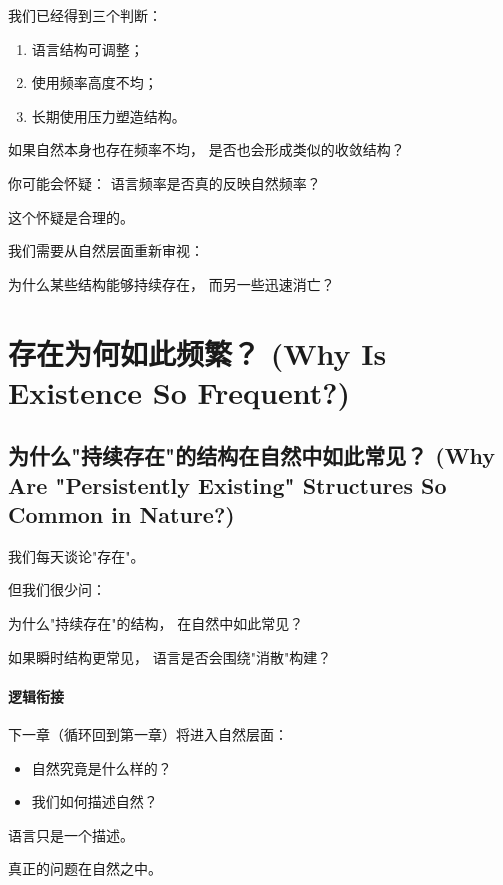 \documentclass[../main.tex]{subfiles}
\begin{document}
我们已经得到三个判断：

\begin{enumerate}
	\item 语言结构可调整；
	\item 使用频率高度不均；
	\item 长期使用压力塑造结构。
\end{enumerate}

\begin{questionbox}
	如果自然本身也存在频率不均，
	是否也会形成类似的收敛结构？
\end{questionbox}

\begin{tcolorbox}[colback=yellow!5,title=\textit{读者行为预测}]
	你可能会怀疑：
	语言频率是否真的反映自然频率？
\end{tcolorbox}

这个怀疑是合理的。

我们需要从自然层面重新审视：

为什么某些结构能够持续存在，
而另一些迅速消亡？


\section{存在为何如此频繁？ (Why Is Existence So Frequent?)}

\subsection{为什么"持续存在"的结构在自然中如此常见？ (Why Are "Persistently Existing" Structures So Common in Nature?)}

我们每天谈论"存在"。

但我们很少问：

为什么"持续存在"的结构，
在自然中如此常见？

如果瞬时结构更常见，
语言是否会围绕"消散"构建？

\paragraph{逻辑衔接}

下一章（循环回到第一章）将进入自然层面：

\begin{itemize}
	\item 自然究竟是什么样的？
	\item 我们如何描述自然？

\end{itemize}

语言只是一个描述。

真正的问题在自然之中。
\end{document}
